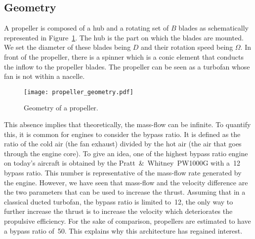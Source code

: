 
\subsection{Geometry}
\label{sub:cror_propeller_geometry}

A propeller is composed of a hub and a rotating set of 
$B$ blades as schematically represented in
Figure~\ref{fig:cror_propeller_geometry}. The hub
is the part on which the blades are mounted.
We set the diameter of these blades being $D$
and their rotation speed being $\Omega$. 
In front of the propeller, there is a spinner which is
a conic element that conducts the 
inflow to the propeller blades.
The propeller can be seen as
a turbofan whose fan is not within a nacelle.
\begin{figure}[htp]
  \centering
  \texttt{[image: propeller\_geometry.pdf]}
  \caption{Geometry of a propeller.}
  \label{fig:cror_propeller_geometry}
\end{figure}
This absence implies that theoretically, the mass-flow can be
infinite. To quantify this, it is common for engines to
consider the bypass ratio. It is defined as the ratio of the
cold air (the fan exhaust)
divided by the hot air (the air that goes through the engine core).
To give an idea, one of the highest bypass ratio engine on today's aircraft is obtained
by the Pratt~\&~Whitney~PW1000G with a~12 bypass ratio. 
This number is representative of the mass-flow rate generated by the engine.
However, we have seen that mass-flow and the velocity
difference are the two parameters that can be used to increase
the thrust. Assuming that in a classical ducted turbofan, 
the bypass ratio is limited to~12, the only
way to further increase the thrust is to increase the 
velocity which deteriorates the propulsive efficiency.
For the sake of comparison, 
propellers are estimated to have a bypass ratio of~50. 
This explains why this architecture has
regained interest.

